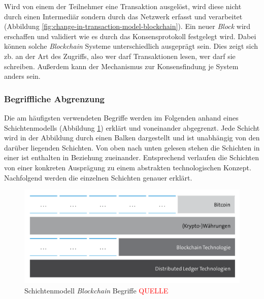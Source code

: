 Wird von einem der Teilnehmer eine Transaktion ausgelöst, wird diese nicht durch einen Intermediär sondern durch das Netzwerk erfasst und verarbeitet (Abbildung \ref{fig:change-in-transaction-model-blockchain}). Ein neuer \textit{Block} wird erschaffen und validiert wie es durch das Konsensprotokoll festgelegt wird. Dabei können solche \textit{Blockchain} Systeme unterschiedlich ausgeprägt sein. Dies zeigt sich zb. an der Art des Zugriffs, also wer darf Transaktionen lesen, wer darf sie schreiben. Außerdem kann der Mechanismus zur Konsensfindung je System anders sein.





\subsubsection{Begriffliche Abgrenzung}

Die am häufigsten verwendeten Begriffe werden im Folgenden anhand eines Schichtenmodells (Abbildung \ref{fig:layer-model-blockchain}) erklärt und voneinander abgegrenzt. Jede Schicht wird in der Abbildung durch einen Balken dargestellt und ist unabhängig von den darüber liegenden Schichten. Von oben nach unten gelesen stehen die Schichten in einer \glqq ist enthalten in\grqq{} Beziehung zueinander. Entsprechend verlaufen die Schichten von einer konkreten Ausprägung zu einem abstrakten technologischen Konzept. Nachfolgend werden die einzelnen Schichten genauer erklärt.

\begin{figure}[H]
	\centering
	\includegraphics[width=1.0\linewidth]{pictures/layer-model-blockchain}
	\caption[Schichtenmodell \textit{Blockchain} Begriffe]{Schichtenmodell \textit{Blockchain} Begriffe \textcolor{red}{QUELLE}}
	\label{fig:layer-model-blockchain}
\end{figure}

